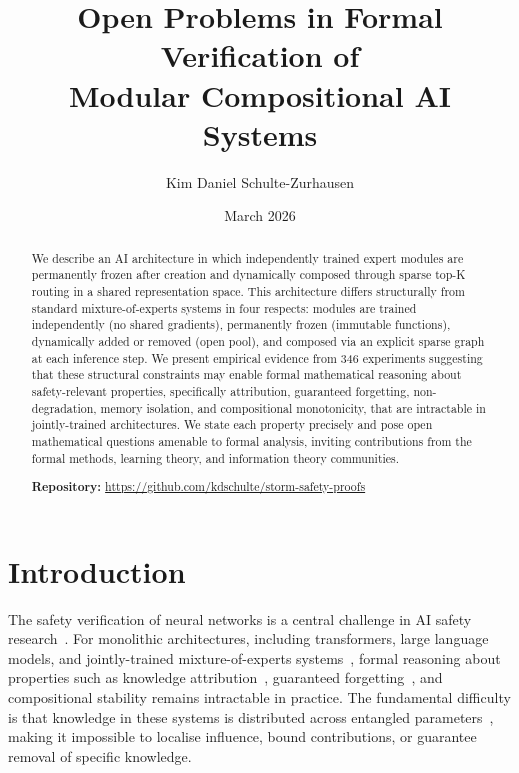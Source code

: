 \documentclass[11pt,a4paper]{article}
\title{Open Problems in Formal Verification of\\Modular Compositional AI Systems}
\author[1]{Kim Daniel Schulte-Zurhausen}
\affil[1]{Modulith Research CIC, Hastings, UK\\
\texttt{research@modulith.ai}}
\date{March 2026}
\begin{document}
\maketitle

\begin{abstract}
We describe an AI architecture in which independently trained expert modules are permanently frozen after creation and dynamically composed through sparse top-K routing in a shared representation space.
This architecture differs structurally from standard mixture-of-experts systems in four respects: modules are trained independently (no shared gradients), permanently frozen (immutable functions), dynamically added or removed (open pool), and composed via an explicit sparse graph at each inference step.
We present empirical evidence from 346 experiments suggesting that these structural constraints may enable formal mathematical reasoning about safety-relevant properties, specifically attribution, guaranteed forgetting, non-degradation, memory isolation, and compositional monotonicity, that are intractable in jointly-trained architectures.
We state each property precisely and pose open mathematical questions amenable to formal analysis, inviting contributions from the formal methods, learning theory, and information theory communities.

\medskip
\noindent\textbf{Repository:} \url{https://github.com/kdschulte/storm-safety-proofs}
\end{abstract}

\section{Introduction}
\label{sec:intro}

The safety verification of neural networks is a central challenge in AI safety research~\cite{amodei2016concrete}.
For monolithic architectures, including transformers, large language models, and jointly-trained mixture-of-experts systems~\cite{shazeer2017outrageously,fedus2022switch}, formal reasoning about properties such as knowledge attribution~\cite{sundararajan2017axiomatic}, guaranteed forgetting~\cite{bourtoule2021machine}, and compositional stability remains intractable in practice.
The fundamental difficulty is that knowledge in these systems is distributed across entangled parameters~\cite{bricken2023monosemanticity}, making it impossible to localise influence, bound contributions, or guarantee removal of specific knowledge.
\end{document}
